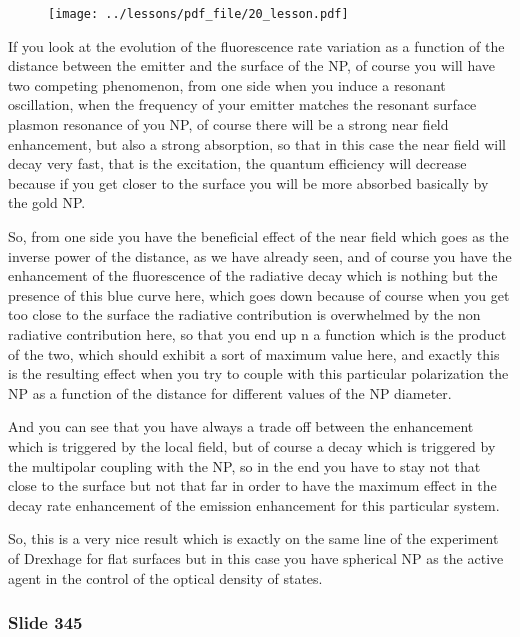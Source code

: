 \documentclass[../main/main.tex]{subfiles}
\begin{document}
\begin{figure}[h!]
\centering
\texttt{[image: ../lessons/pdf\_file/20\_lesson.pdf]}
\end{figure}

If you look at the evolution of the fluorescence rate variation as a function of the distance between the emitter and the surface of the NP, of course you will have two competing phenomenon, from one side when you induce a resonant oscillation, when the frequency of your emitter matches the resonant surface plasmon resonance of you NP, of course there will be a strong near field enhancement, but also a strong absorption, so that in this case the near field will decay very fast, that is the excitation, the quantum efficiency will decrease because if you get closer to the surface you will be more absorbed basically by the gold NP.

So, from one side you have the beneficial effect of the near field which goes as the inverse power of the distance, as we have already seen, and of course you have the enhancement of the fluorescence of the radiative decay which is nothing but the presence of this blue curve here, which goes down because of course when you get too close to the surface the radiative contribution is overwhelmed by the non radiative contribution here, so that you end up n a function which is the product of the two, which should exhibit a sort of maximum value here, and exactly this is the resulting effect when you try to couple with this particular polarization the NP as a function of the distance for different values of the NP diameter.

And you can see that you have always a trade off between the enhancement which is triggered by the local field, but of course a decay which is triggered by the multipolar coupling with the NP, so in the end you have to stay not that close to the surface but not that far in order to have the maximum effect in the decay rate enhancement of the emission enhancement for this particular system.

So, this is a very nice result which is exactly on the same line of the experiment of Drexhage for flat surfaces but in this case you have spherical NP as the active agent in the control of the optical density of states.


\newpage

\subsubsection{Slide 345}
\end{document}
